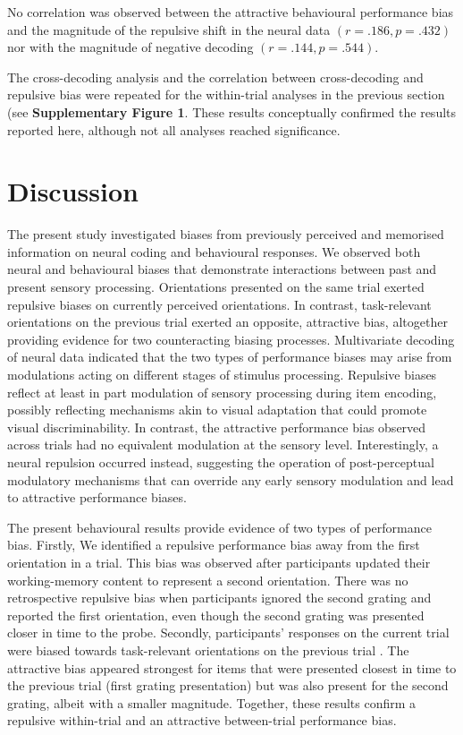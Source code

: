\documentclass{article}
\begin{document}
No correlation was observed between the attractive behavioural performance bias and the magnitude of the repulsive shift in the neural data $(r = .186, p = .432)$ nor with the magnitude of negative decoding $(r = .144, p = .544)$.

The cross-decoding analysis and the correlation between cross-decoding and repulsive bias were repeated for the within-trial analyses in the previous section (see \textbf{Supplementary Figure 1}. These results conceptually confirmed the results reported here, although not all analyses reached significance. 


\section{Discussion}
The present study investigated biases from previously perceived and memorised information on neural coding and behavioural responses. We observed both neural and behavioural biases that demonstrate interactions between past and present sensory processing. Orientations presented on the same trial exerted repulsive biases on currently perceived orientations. In contrast, task-relevant orientations on the previous trial exerted an opposite, attractive bias, altogether providing evidence for two counteracting biasing processes. Multivariate decoding of neural data indicated that the two types of performance biases may arise from modulations acting on different stages of stimulus processing. Repulsive biases reflect at least in part modulation of sensory processing during item encoding, possibly reflecting mechanisms akin to visual adaptation that could promote visual discriminability. In contrast, the attractive performance bias observed across trials had no equivalent modulation at the sensory level. Interestingly, a neural repulsion occurred instead, suggesting the operation of post-perceptual modulatory mechanisms that can override any early sensory modulation and lead to attractive performance biases.


The present behavioural results provide evidence of two types of performance bias. Firstly, We identified a repulsive performance bias away from the first orientation in a trial. This bias was observed after participants updated their working-memory content to represent a second orientation. There was no retrospective repulsive bias when participants ignored the second grating and reported the first orientation, even though the second grating was presented closer in time to the probe. Secondly, participants’ responses on the current trial were biased towards task-relevant orientations on the previous trial \parencite[c.f., ][]{Bae2020, Fischer2020}. The attractive bias appeared strongest for items that were presented closest in time to the previous trial (first grating presentation) but was also present for the second grating, albeit with a smaller magnitude. Together, these results confirm a repulsive within-trial and an attractive between-trial performance bias.
\end{document}
